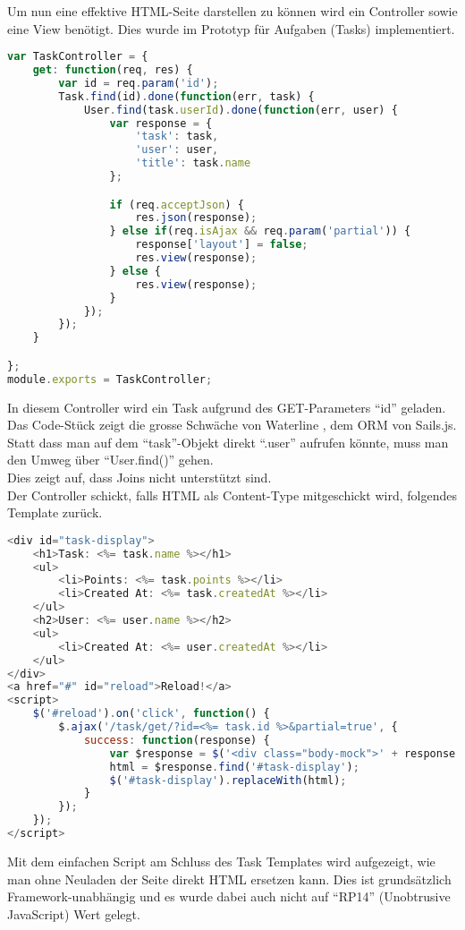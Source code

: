 Um nun eine effektive HTML-Seite darstellen zu können wird ein Controller sowie eine View benötigt. Dies wurde im Prototyp für Aufgaben (Tasks) implementiert.\\

\begin{lstlisting}[language=JavaScript, caption=Task Controller in Sails.js, label=lst:sailsjstaskcontroller]
var TaskController = {
	get: function(req, res) {
		var id = req.param('id');
		Task.find(id).done(function(err, task) {
			User.find(task.userId).done(function(err, user) {
				var response = {
					'task': task,
					'user': user,
					'title': task.name
				};

				if (req.acceptJson) {
					res.json(response);
				} else if(req.isAjax && req.param('partial')) {
					response['layout'] = false;
					res.view(response);
				} else {
					res.view(response);
				}
			});
		});
	}

};
module.exports = TaskController;
\end{lstlisting}

In diesem Controller wird ein Task aufgrund des GET-Parameters ``id'' geladen. Das Code-Stück zeigt die grosse Schwäche von Waterline \cite{Waterline}, dem \gls{ORM} von Sails.js. Statt dass man auf dem ``task''-Objekt direkt ``.user'' aufrufen könnte, muss man den Umweg über ``User.find()'' gehen. \\
Dies zeigt auf, dass Joins nicht unterstützt sind.\\[1mm]

Der Controller schickt, falls HTML als Content-Type mitgeschickt wird, folgendes Template zurück.

\begin{lstlisting}[language=JavaScript, caption=Task Template]
<div id="task-display">
	<h1>Task: <%= task.name %></h1>
	<ul>
		<li>Points: <%= task.points %></li>
		<li>Created At: <%= task.createdAt %></li>
	</ul>
	<h2>User: <%= user.name %></h2>
	<ul>
		<li>Created At: <%= user.createdAt %></li>
	</ul>
</div>
<a href="#" id="reload">Reload!</a>
<script>
	$('#reload').on('click', function() {
		$.ajax('/task/get/?id=<%= task.id %>&partial=true', {
			success: function(response) {
				var $response = $('<div class="body-mock">' + response + '</div>');
				html = $response.find('#task-display');
				$('#task-display').replaceWith(html);
			}
		});
	});
</script>
\end{lstlisting}

Mit dem einfachen Script am Schluss des Task Templates wird aufgezeigt, wie man ohne Neuladen der Seite direkt HTML ersetzen kann. Dies ist grundsätzlich Framework-unabhängig und es wurde dabei auch nicht auf ``RP14'' (Unobtrusive JavaScript) Wert gelegt.

